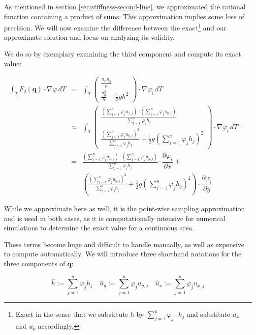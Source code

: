 \documentclass{article}
\newcommand{\pd}[2]{\dfrac{\partial #1}{\partial #2}}
\renewcommand{\phi}{\varphi}
\begin{document}
As mentioned in section \ref{sec:stiffness-second-line}, we approximated the rational function containing a product of sums. This approximation implies some loss of precision. We will now examine the difference between the exact\footnote{Exact in the sense that we substitute $h$ by $\sum_{j=1}^n \phi_j \cdot h_j$ and substitute $u_x$ and $u_y$ accordingly.} and our approximate solution and focus on analyzing its validity.

We do so by exemplary examining the third component and compute its exact value:

\begin{eqnarray*}
  \int_T F_2\left(\mathbf{q}\right) \cdot \nabla \phi \, dT & = &
  \int_T
  \begin{pmatrix}
    \frac{u_x u_y}{h} \\ \frac{u_y^2}{h} + \frac{1}{2} g h^2
  \end{pmatrix}
  \cdot \nabla \phi_i \, dT \\
  & \approx & \int_T
  \begin{pmatrix}
    \frac{(\sum_{j=1}^n \phi_j u_{x,j}) \cdot (\sum_{j=1}^n \phi_j u_{y,j})}{\sum_{j=1}^n \phi_j h_j} \\ \frac{(\sum_{j=1}^n \phi_j u_{y,j})^2}{\sum_{j=1}^n \phi_j h_j} + \frac{1}{2} g (\sum_{j=1}^n \phi_j h_j)^2
  \end{pmatrix}
  \cdot \nabla \phi_i \, dT = \\
  & = &
  \frac{(\sum_{j=1}^n \phi_j u_{x,j}) \cdot (\sum_{j=1}^n \phi_j u_{y,j})}{\sum_{j=1}^n \phi_j h_j} \cdot \pd{\phi_i}{x} + \\
  & & \left( \frac{(\sum_{j=1}^n \phi_j u_{y,j})^2}{\sum_{j=1}^n \phi_j h_j} + \frac{1}{2} g (\sum_{j=1}^n \phi_j h_j)^2 \right) \cdot \pd{\phi_i}{y}
\end{eqnarray*}

While we approximate here as well, it is the point-wise sampling approximation and is used in both cases, as it is computationally intensive for numerical simulations to determine the exact value for a continuous area.

These terms become huge and difficult to handle manually, as well as expensive to compute automatically. We will introduce three shorthand notations for the three components of $\mathbf{q}$:

\begin{equation}
  \label{eq:substitutions-for-all-components-with-hat}
  \widehat{h} := \sum_{j=1}^n \phi_j h_j \quad
  \widehat{u}_y := \sum_{j=1}^n \phi_j u_{y,j} \quad
  \widehat{u}_x := \sum_{j=1}^n \phi_j u_{x,j}
\end{equation}
\end{document}
